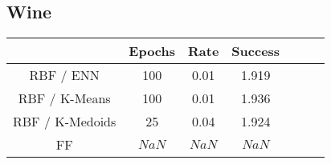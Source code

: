 \documentclass[twoside,11pt]{article}
\begin{document}
\subsection{Wine}
\begin{center}
\begin{tabular}{ |c|c|c|c|c|c|c| }
\hline
{Algorithm & Epochs & Rate & Success \\
\hline
RBF / ENN & 100 & 0.01 & 1.919 \\
\hline
RBF / K-Means & 100 & 0.01 & 1.936 \\
\hline
RBF / K-Medoids & 25 & 0.04 & 1.924 \\
\hline
FF & $NaN$ & $NaN$ & $NaN$ \\
\hline
\end{tabular}
\end{center}


\end{document}
